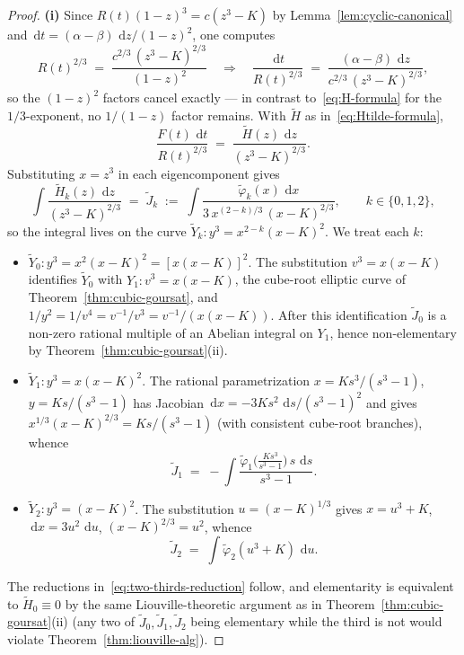 \documentclass[11pt,a4paper]{article}
\theoremstyle{plain}
\theoremstyle{definition}
\theoremstyle{remark}
\renewcommand{\d}{\,\mathrm{d}}
\begin{document}
\begin{proof}
\textbf{(i)} Since $R(t)(1-z)^3 = c(z^3-K)$ by Lemma~\ref{lem:cyclic-canonical} and $\d t = (\alpha-\beta)\,\d z/(1-z)^2$, one computes
\[
  R(t)^{2/3} \;=\; \frac{c^{2/3}\,(z^3-K)^{2/3}}{(1-z)^2}
  \quad\Longrightarrow\quad
  \frac{\d t}{R(t)^{2/3}} \;=\; \frac{(\alpha-\beta)\,\d z}{c^{2/3}\,(z^3-K)^{2/3}},
\]
so the $(1-z)^2$ factors cancel exactly --- in contrast to~\eqref{eq:H-formula} for the $1/3$-exponent, no $1/(1-z)$ factor remains. With $\widetilde H$ as in~\eqref{eq:Htilde-formula},
\[
  \frac{F(t)\,\d t}{R(t)^{2/3}} \;=\; \frac{\widetilde H(z)\,\d z}{(z^3-K)^{2/3}}.
\]
Substituting $x=z^3$ in each eigencomponent gives
\[
  \int \frac{\widetilde H_k(z)\,\d z}{(z^3-K)^{2/3}}
  \;=\; \widetilde J_k \;:=\; \int \frac{\widetilde\varphi_k(x)\,\d x}{3\,x^{(2-k)/3}\,(x-K)^{2/3}}, \qquad k\in\{0,1,2\},
\]
so the integral lives on the curve $\widetilde Y_k\colon y^3 = x^{2-k}(x-K)^2$. We treat each $k$:
\begin{itemize}
  \item $\widetilde Y_0\colon y^3 = x^2(x-K)^2 = [x(x-K)]^2$. The substitution $v^3 = x(x-K)$ identifies $\widetilde Y_0$ with $Y_1\colon v^3 = x(x-K)$, the cube-root elliptic curve of Theorem~\ref{thm:cubic-goursat}, and $1/y^2 = 1/v^4 = v^{-1}/v^3 = v^{-1}/(x(x-K))$. After this identification $\widetilde J_0$ is a non-zero rational multiple of an Abelian integral on $Y_1$, hence non-elementary by Theorem~\ref{thm:cubic-goursat}(ii).
  \item $\widetilde Y_1\colon y^3 = x(x-K)^2$. The rational parametrization $x = Ks^3/(s^3-1)$, $y=Ks/(s^3-1)$ has Jacobian $\d x = -3Ks^2\,\d s/(s^3-1)^2$ and gives $x^{1/3}(x-K)^{2/3} = Ks/(s^3-1)$ (with consistent cube-root branches), whence
  \[
    \widetilde J_1 \;=\; -\!\int \frac{\widetilde\varphi_1\!\bigl(\tfrac{Ks^3}{s^3-1}\bigr)\,s\,\d s}{s^3-1}.
  \]
  \item $\widetilde Y_2\colon y^3 = (x-K)^2$. The substitution $u = (x-K)^{1/3}$ gives $x=u^3+K$, $\d x = 3u^2\,\d u$, $(x-K)^{2/3} = u^2$, whence
  \[
    \widetilde J_2 \;=\; \int \widetilde\varphi_2(u^3+K)\,\d u.
  \]
\end{itemize}
The reductions in~\eqref{eq:two-thirds-reduction} follow, and elementarity is equivalent to $\widetilde H_0\equiv 0$ by the same Liouville-theoretic argument as in Theorem~\ref{thm:cubic-goursat}(ii) (any two of $\widetilde J_0,\widetilde J_1,\widetilde J_2$ being elementary while the third is not would violate Theorem~\ref{thm:liouville-alg}).


\end{proof}
\end{document}
